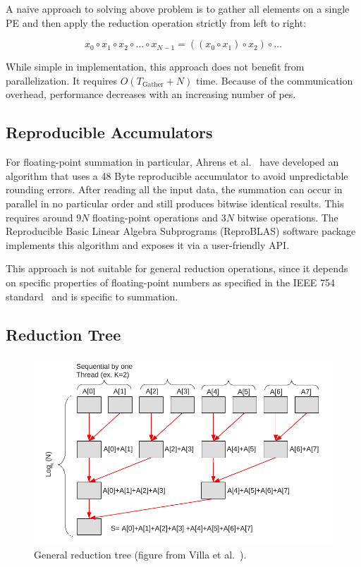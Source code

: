 A naive approach to solving above problem is to gather all elements on a single PE and then apply the reduction operation strictly from left to right:

\begin{equation}
x_0 \circ x_1 \circ x_2 \circ \ldots  \circ x_{N-1} = ((x_0 \circ x_1) \circ x_2) \circ \ldots
\end{equation}

While simple in implementation, this approach does not benefit from parallelization.
It requires $O(T_\textrm{Gather} + N)$ time.
Because of the communication overhead, performance decreases with an increasing number of \glspl{pe}.


\subsection{Reproducible Accumulators}
\label{sec:Reproducible Accumulators}
For floating-point summation in particular, Ahrens et al.~\cite{ahrens_algorithms_2020} have developed an algorithm that uses a 48 Byte reproducible accumulator to avoid unpredictable rounding errors.
After reading all the input data, the summation can occur in parallel in no particular order and still produces bitwise identical results.
This requires around $9N$ floating-point operations and $3N$ bitwise operations.
The Reproducible Basic Linear Algebra Subprograms (ReproBLAS) software package implements this algorithm and exposes it via a user-friendly API.\@

This approach is not suitable for general reduction operations, since it depends on specific properties of floating-point numbers as specified in the IEEE 754 standard~\cite{noauthor_ieee_nodate} and is specific to summation.


\subsection{Reduction Tree}
\label{sec:ReductionTree}

\begin{figure}[H]
\centering
\includegraphics[scale=0.7]{figures/villa_et_al_reduction_tree.pdf}
\caption[General reduction tree]{General reduction tree (figure from Villa et al.\ \cite{villa_effects_2009}).}
\label{fig:villa_reduction_tree}
\end{figure}


